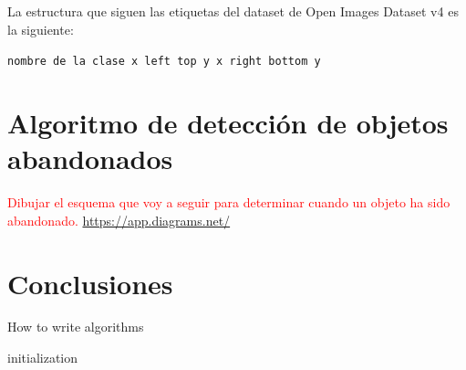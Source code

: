 La estructura que siguen las etiquetas del dataset de Open Images Dataset v4 es la siguiente:

\texttt{nombre de la clase x left top y x right bottom y}


\newpage

\section{Algoritmo de detección de objetos abandonados}
\label{sec:algoritmo-object-detection}

\textcolor{red}{Dibujar el esquema que voy a seguir para determinar cuando un objeto ha sido abandonado.}
\url{https://app.diagrams.net/}

\newpage

\section{Conclusiones}
\label{sec:conclu-desarrollo}

\begin{algorithm}[H]
 \caption{How to write algorithms}
 \label{alg:howto}
 initialization\;
\end{algorithm}